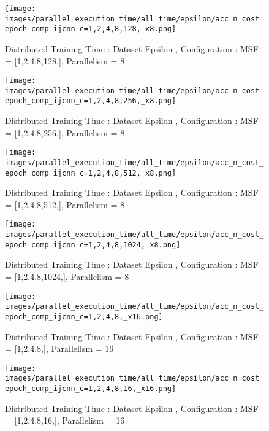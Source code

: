 \begin{figure*}[htbp]
\centering
\texttt{[image: images/parallel\_execution\_time/all\_time/epsilon/acc\_n\_cost\_epoch\_comp\_ijcnn\_c=1,2,4,8,128,\_x8.png]}
\caption{Distributed Training Time : Dataset Epsilon , Configuration : MSF = [1,2,4,8,128,], Parallelism = 8}
\label{fig:dis-msf-tr-time-epsilon-x8}
\end{figure*}


\begin{figure*}[htbp]
\centering
\texttt{[image: images/parallel\_execution\_time/all\_time/epsilon/acc\_n\_cost\_epoch\_comp\_ijcnn\_c=1,2,4,8,256,\_x8.png]}
\caption{Distributed Training Time : Dataset Epsilon , Configuration : MSF = [1,2,4,8,256,], Parallelism = 8}
\label{fig:dis-msf-tr-time-epsilon-x8}
\end{figure*}


\begin{figure*}[htbp]
\centering
\texttt{[image: images/parallel\_execution\_time/all\_time/epsilon/acc\_n\_cost\_epoch\_comp\_ijcnn\_c=1,2,4,8,512,\_x8.png]}
\caption{Distributed Training Time : Dataset Epsilon , Configuration : MSF = [1,2,4,8,512,], Parallelism = 8}
\label{fig:dis-msf-tr-time-epsilon-x8}
\end{figure*}


\begin{figure*}[htbp]
\centering
\texttt{[image: images/parallel\_execution\_time/all\_time/epsilon/acc\_n\_cost\_epoch\_comp\_ijcnn\_c=1,2,4,8,1024,\_x8.png]}
\caption{Distributed Training Time : Dataset Epsilon , Configuration : MSF = [1,2,4,8,1024,], Parallelism = 8}
\label{fig:dis-msf-tr-time-epsilon-x8}
\end{figure*}


\begin{figure*}[htbp]
\centering
\texttt{[image: images/parallel\_execution\_time/all\_time/epsilon/acc\_n\_cost\_epoch\_comp\_ijcnn\_c=1,2,4,8,\_x16.png]}
\caption{Distributed Training Time : Dataset Epsilon , Configuration : MSF = [1,2,4,8,], Parallelism = 16}
\label{fig:dis-msf-tr-time-epsilon-x16}
\end{figure*}


\begin{figure*}[htbp]
\centering
\texttt{[image: images/parallel\_execution\_time/all\_time/epsilon/acc\_n\_cost\_epoch\_comp\_ijcnn\_c=1,2,4,8,16,\_x16.png]}
\caption{Distributed Training Time : Dataset Epsilon , Configuration : MSF = [1,2,4,8,16,], Parallelism = 16}
\label{fig:dis-msf-tr-time-epsilon-x16}
\end{figure*}



